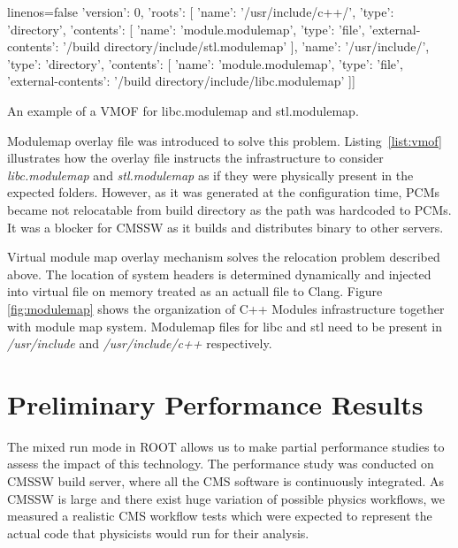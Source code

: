 \documentclass[12pt]{iopart}
\begin{document}
\begin{listing}[h]
\noindent
\begin{minipage}[h]{\textwidth}
\begin{cppcode*}{linenos=false}
{ 'version': 0,
  'roots': [
    { 'name': '/usr/include/c++/', 'type': 'directory',
      'contents': [
        { 'name': 'module.modulemap', 'type': 'file',
          'external-contents': '/build directory/include/stl.modulemap' }]},
    { 'name': '/usr/include/', 'type': 'directory',
      'contents': [
        { 'name': 'module.modulemap', 'type': 'file',
          'external-contents': '/build directory/include/libc.modulemap'
        }]}]}
\end{cppcode*}
\end{minipage}
\caption{An example of a VMOF for libc.modulemap and stl.modulemap.}
\label{list:vmof}
\end{listing}

Modulemap overlay file was introduced to solve this problem. Listing~\ref{list:vmof} illustrates how the overlay file instructs the infrastructure to consider \textit{libc.modulemap} and \textit{stl.modulemap} as if they were physically present in the expected folders. However, as it was generated at the configuration time, PCMs became not relocatable from build directory as the path was hardcoded to PCMs. It was a blocker for CMSSW as it builds and distributes binary to other servers.

Virtual module map overlay mechanism solves the relocation problem described above. The location of system headers is determined dynamically and injected into virtual file on memory treated as an actuall file to Clang. Figure \ref{fig:modulemap} shows the organization of C++ Modules infrastructure together with module map system. Modulemap files for libc and stl need to be present in \textit{/usr/include} and \textit{/usr/include/c++} respectively. 


\section{Preliminary Performance Results}
\label{results}

The mixed run mode in ROOT allows us to make partial performance studies to assess the impact of this technology. The performance study was conducted on CMSSW build server, where all the CMS software is continuously integrated. As CMSSW is large and there exist huge variation of possible physics workflows, we measured a realistic CMS workflow tests which were expected to represent the actual code that physicists would run for their analysis.
\end{document}

